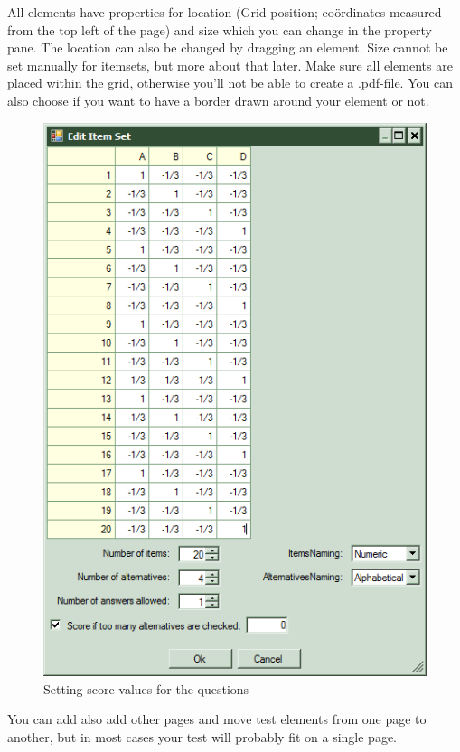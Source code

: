 \documentclass[10pt,a4paper]{article}
\begin{document}
All elements have properties for location (Grid position; co\"ordinates measured from the top left of the page) and size which you can change in the property pane. The location can also be changed by dragging an element. Size cannot be set manually for itemsets, but more about that later. Make sure all elements are placed within the grid, otherwise you'll not be able to create a .pdf-file. You can also choose if you want to have a border drawn around your element or not.

\begin{figure}
\centering
\vspace{-10pt}
\includegraphics[scale=.55]{img/edititemset.png}
\caption{Setting score values for the questions}
\vspace{-25pt}
\label{fig:settingscores}
\end{figure}

You can add also add other pages and move test elements from one page to another, but in most cases your test will probably fit on a single page. 
\end{document}
